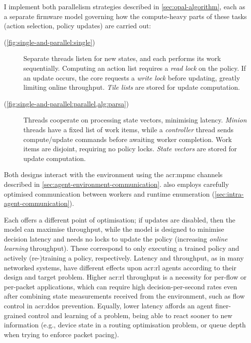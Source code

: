 I implement both parallelism strategies described in \cref{sec:opal-algorithm}, each as a separate firmware model governing how the compute-heavy parts of these tasks (action selection, policy updates) are carried out:
\begin{description}
	\item[\Indfw{} (\cref{fig:single-and-parallel:single})] Separate threads listen for new states, and each performs its work sequentially. Computing an action list requires a \emph{read lock} on the policy. If an update occurs, the core requests a \emph{write lock} before updating, greatly limiting online throughput. \emph{Tile lists} are stored for update computation.
	\item[\Coopfw{} (\cref{fig:single-and-parallel:parallel,alg:parsa})] Threads cooperate on processing state vectors, minimising latency. \emph{Minion} threads have a fixed list of work items, while a \emph{controller} thread sends compute/update commands before awaiting worker completion. Work items are disjoint, requiring no policy locks. \emph{State vectors} are stored for update computation.
\end{description}
Both designs interact with the environment using the \gls{acr:mpmc} channels described in \cref{sec:agent-environment-communication}.
\Coopfw{} also employs carefully optimised communication between workers and runtime enumeration (\cref{sec:intra-agent-communication}).

Each offers a different point of optimisation; if updates are disabled, then the \indfw{} model can maximise throughput, while the \coopfw{} model is designed to minimise decision latency and needs no locks to update the policy (increasing \emph{online learning} throughput).
These correspond to only executing a trained policy and actively (re-)training a policy, respectively.
Latency and throughput, as in many networked systems, have different effects upon \gls{acr:rl} agents according to their design and target problem.
Higher \gls{acr:rl} throughput is a necessity for per-flow or per-packet applications, which can require high decision-per-second rates even after combining state measurements received from the environment, such as flow control in \gls{acr:ddos} prevention.
Equally, lower latency affords an agent finer-grained control and learning of a problem, being able to react sooner to new information (e.g., device state in a routing optimisation problem, or queue depth when trying to enforce packet pacing).

